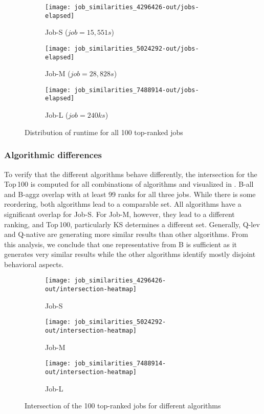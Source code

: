 \documentclass{jhps}
\begin{document}
\begin{figure}
\begin{subfigure}{0.7\textwidth}
\centering
\texttt{[image: job\_similarities\_4296426-out/jobs-elapsed]}
\caption{Job-S ($job=15,551s$)}\label{fig:runtime-job-S}
\end{subfigure}
\begin{subfigure}{0.7\textwidth}
\centering
\texttt{[image: job\_similarities\_5024292-out/jobs-elapsed]}
\caption{Job-M ($job=28,828s$)}\label{fig:runtime-job-M}
\end{subfigure}
\begin{subfigure}{0.7\textwidth}
\centering
\texttt{[image: job\_similarities\_7488914-out/jobs-elapsed]}
\caption{Job-L ($job=240ks$)}\label{fig:runtime-job-L}
\end{subfigure}
\centering
\caption{Distribution of runtime for all 100 top-ranked jobs}%
\label{fig:runtime-job}
\end{figure}

\subsubsection{Algorithmic differences}
To verify that the different algorithms behave differently, the intersection for the Top\,100 is computed for all combinations of algorithms and visualized in .
B-all and B-aggz overlap with at least 99 ranks for all three jobs.
While there is some reordering, both algorithms lead to a comparable set.
All algorithms have a significant overlap for Job-S.
For Job-M, however, they lead to a different ranking, and Top\,100, particularly KS determines a different set.
Generally, Q-lev and Q-native are generating more similar results than other algorithms.
From this analysis, we conclude that one representative from B is sufficient as it generates very similar results while the other algorithms identify mostly disjoint behavioral aspects. %


\begin{figure}[t]
\begin{subfigure}{0.48\textwidth}
\centering
\texttt{[image: job\_similarities\_4296426-out/intersection-heatmap]}
\caption{Job-S}\label{fig:heatmap-job-S}
\end{subfigure}
\begin{subfigure}{0.48\textwidth}
\centering
\texttt{[image: job\_similarities\_5024292-out/intersection-heatmap]}
\caption{Job-M}\label{fig:heatmap-job-M} %
\end{subfigure}
\begin{subfigure}{0.52\textwidth}
\centering
\texttt{[image: job\_similarities\_7488914-out/intersection-heatmap]}
\caption{Job-L}\label{fig:heatmap-job-L}
\end{subfigure}

\centering
\caption{Intersection of the 100 top-ranked jobs for different algorithms}%
\label{fig:heatmap-job}
\end{figure}
\end{document}
